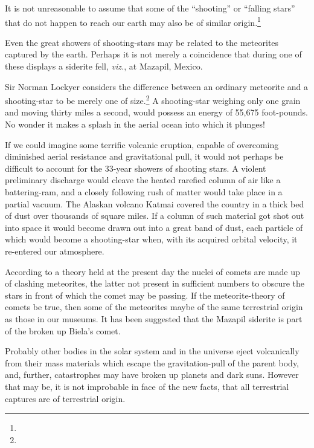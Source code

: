 \documentclass[a4paper, 12pt, oneside]{article}
\begin{document}
It is not unreasonable to assume that some of the ``shooting'' or ``falling stars'' that do not happen to reach our earth may also be of similar origin.\footnote{}

Even the great showers of shooting-stars may be related to the meteorites captured by the earth. Perhaps it is not merely a coincidence that during one of these displays a siderite fell, \emph{viz.}, at Mazapil, Mexico.

Sir Norman Lockyer considers the difference between an ordinary meteorite and a shooting-star to be merely one of size.\footnote{} A shooting-star weighing only one grain and moving thirty miles a second, would possess an energy of 55,675 foot-pounds. No wonder it makes a splash in the aerial ocean into which it plunges!

If we could imagine some terrific volcanic eruption, capable of overcoming diminished aerial resistance and gravitational pull, it would not perhaps be difficult to account for the 33-year showers of shooting stars. A violent preliminary discharge would cleave the heated rarefied column of air like a battering-ram, and a closely following rush of matter would take place in a partial vacuum. The Alaskan volcano Katmai covered the country in a thick bed of dust over thousands of square miles. If a column of such material got shot out into space it would become drawn out into a great band of dust, each particle of which would become a shooting-star when, with its acquired orbital velocity, it re-entered our atmosphere.

According to a theory held at the present day the nuclei of comets are made up of clashing meteorites, the latter not present in sufficient numbers to obscure the stars in front of which the comet may be passing. If the meteorite-theory of comets be true, then some of the meteorites maybe of the same terrestrial origin as those in our museums. It has been suggested that the Mazapil siderite is part of the broken up Biela's comet.

Probably other bodies in the solar system and in the universe eject volcanically from their mass materials which escape the gravitation-pull of the parent body, and, further, catastrophes may have broken up planets and dark suns. However that may be, it is not improbable in face of the new facts, that all terrestrial captures are of terrestrial origin.
\end{document}
